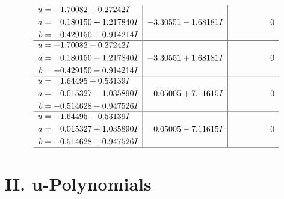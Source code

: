 \documentclass[1p]{elsarticle_modified}
\theoremstyle{definition}
\begin{document}
$$\begin{array}{c|c|c}
\begin{aligned}
u &= -1.70082 + 0.27242 I \\
a &= \phantom{-}0.180150 + 1.217840 I \\
b &= -0.429150 + 0.914214 I\end{aligned}
 & -3.30551 - 1.68181 I & \phantom{-0.000000 } 0 \\ \hline\begin{aligned}
u &= -1.70082 - 0.27242 I \\
a &= \phantom{-}0.180150 - 1.217840 I \\
b &= -0.429150 - 0.914214 I\end{aligned}
 & -3.30551 + 1.68181 I & \phantom{-0.000000 } 0 \\ \hline\begin{aligned}
u &= \phantom{-}1.64495 + 0.53139 I \\
a &= \phantom{-}0.015327 - 1.035890 I \\
b &= -0.514628 - 0.947526 I\end{aligned}
 & \phantom{-}0.05005 + 7.11615 I & \phantom{-0.000000 } 0 \\ \hline\begin{aligned}
u &= \phantom{-}1.64495 - 0.53139 I \\
a &= \phantom{-}0.015327 + 1.035890 I \\
b &= -0.514628 + 0.947526 I\end{aligned}
 & \phantom{-}0.05005 - 7.11615 I & \phantom{-0.000000 } 0\\
 \hline 
 \end{array}$$\newpage
\newpage\renewcommand{\arraystretch}{1}
\centering \section*{ II. u-Polynomials}
\end{document}

